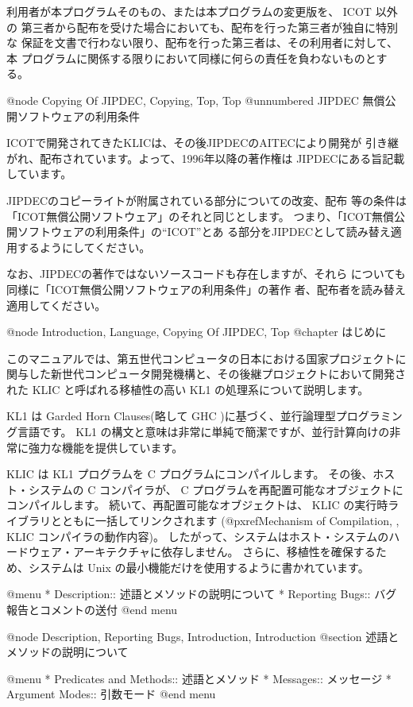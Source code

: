 利用者が本プログラムそのもの、または本プログラムの変更版を、 ICOT 以外の
第三者から配布を受けた場合においても、配布を行った第三者が独自に特別な
保証を文書で行わない限り、配布を行った第三者は、その利用者に対して、本
プログラムに関係する限りにおいて同様に何らの責任を負わないものとする。

@node Copying Of JIPDEC, Copying, Top, Top
@unnumbered JIPDEC 無償公開ソフトウェアの利用条件

ICOTで開発されてきたKLICは、その後JIPDECのAITECにより開発が
引き継がれ、配布されています。よって、1996年以降の著作権は
JIPDECにある旨記載しています。

JIPDECのコピーライトが附属されている部分についての改変、配布
等の条件は「ICOT無償公開ソフトウェア」のそれと同じとします。
つまり、「ICOT無償公開ソフトウェアの利用条件」の``ICOT''とあ
る部分をJIPDECとして読み替え適用するようにしてください。

なお、JIPDECの著作ではないソースコードも存在しますが、それら
についても同様に「ICOT無償公開ソフトウェアの利用条件」の著作
者、配布者を読み替え適用してください。

@node Introduction, Language, Copying Of JIPDEC, Top
@chapter はじめに

このマニュアルでは、第五世代コンピュータの日本における国家プロジェクトに関与した新世代コンピュータ開発機構と、その後継プロジェクトにおいて開発された KLIC と呼ばれる移植性の高い KL1 の処理系について説明します。

KL1 は Garded Horn Clauses(略して GHC )に基づく、並行論理型プログラミング言語です。
 KL1 の構文と意味は非常に単純で簡潔ですが、並行計算向けの非常に強力な機能を提供しています。

KLIC は KL1 プログラムを C プログラムにコンパイルします。
その後、ホスト・システムの C コンパイラが、 C プログラムを再配置可能なオブジェクトにコンパイルします。
続いて、再配置可能なオブジェクトは、 KLIC の実行時ライブラリとともに一括してリンクされます
(@pxref{Mechanism of Compilation, , KLIC コンパイラの動作内容})。
したがって、システムはホスト・システムのハードウェア・アーキテクチャに依存しません。
さらに、移植性を確保するため、システムは Unix の最小機能だけを使用するように書かれています。

@menu
* Description::                 述語とメソッドの説明について
* Reporting Bugs::              バグ報告とコメントの送付
@end menu

@node Description, Reporting Bugs, Introduction, Introduction
@section 述語とメソッドの説明について

@menu
* Predicates and Methods::      述語とメソッド
* Messages::                    メッセージ
* Argument Modes::              引数モード
@end menu

